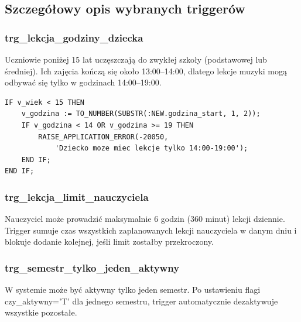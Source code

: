 \documentclass[12pt,a4paper]{article}
\begin{document}
\subsection{Szczegółowy opis wybranych triggerów}

\subsubsection{trg\_lekcja\_godziny\_dziecka}
Uczniowie poniżej 15 lat uczęszczają do zwykłej szkoły (podstawowej lub średniej). Ich zajęcia kończą się około 13:00--14:00, dlatego lekcje muzyki mogą odbywać się tylko w godzinach 14:00--19:00.

\begin{verbatim}
IF v_wiek < 15 THEN
    v_godzina := TO_NUMBER(SUBSTR(:NEW.godzina_start, 1, 2));
    IF v_godzina < 14 OR v_godzina >= 19 THEN
        RAISE_APPLICATION_ERROR(-20050,
            'Dziecko moze miec lekcje tylko 14:00-19:00');
    END IF;
END IF;
\end{verbatim}

\subsubsection{trg\_lekcja\_limit\_nauczyciela}
Nauczyciel może prowadzić maksymalnie 6 godzin (360 minut) lekcji dziennie. Trigger sumuje czas wszystkich zaplanowanych lekcji nauczyciela w danym dniu i blokuje dodanie kolejnej, jeśli limit zostałby przekroczony.

\subsubsection{trg\_semestr\_tylko\_jeden\_aktywny}
W systemie może być aktywny tylko jeden semestr. Po ustawieniu flagi czy\_aktywny='T' dla jednego semestru, trigger automatycznie dezaktywuje wszystkie pozostałe.
\end{document}
